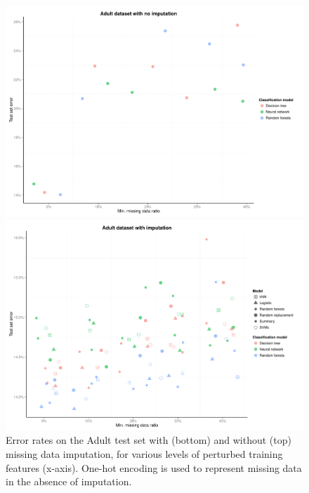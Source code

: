 \documentclass[10pt]{book}
\theoremstyle{definition}
\begin{document}
\begin{figure}[h!]
\includegraphics [scale=0.45]{figure/test-errors-adult-no-imp.pdf}\par
\includegraphics [scale=0.45]{figure/test-errors-adult-imp.pdf}\par
   \caption{\footnotesize Error rates on the Adult test set with (bottom) and without (top) missing data imputation, for various levels of perturbed training features (x-axis). One-hot encoding is used to represent missing data in the absence of imputation.}
   \label{fig:test-error-adult}
\end{figure}
\end{document}
